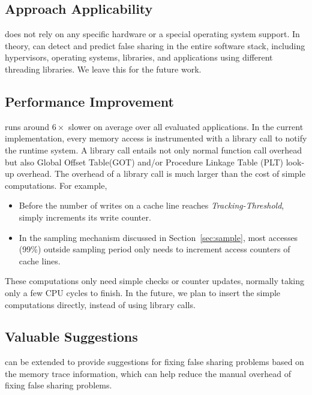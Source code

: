 \label{sec:futurework}

\subsection{Approach Applicability}
\Predator{} does not rely on any specific hardware or a special operating system support.
In theory, \Predator{} can detect and predict false sharing in the entire software stack, including hypervisors, operating systems, libraries, and applications using different threading libraries. We leave this for the future work. 

\subsection{Performance Improvement}
\Predator{} runs around $6\times$ slower on average over all evaluated applications. In the current implementation, every memory access is instrumented with a library call to notify the runtime system. A library call entails not only normal function call overhead but also Global Offset Table(GOT) and/or Procedure Linkage Table (PLT) look-up overhead. 
The overhead of a library call is much larger than the cost of simple computations. For example, 

\begin{itemize}
\item
Before the number of writes on a cache line reaches {\it Tracking-Threshold},  \Predator{} simply increments its write counter.

\item
In the sampling mechanism discussed in Section~\ref{sec:sample}, most accesses (99\%) outside sampling period only needs to increment access counters of cache lines.
\end{itemize}

These computations only need simple checks or counter updates, normally taking only a few CPU cycles to finish. 
In the future, we plan to insert the simple computations directly, instead of using library calls.

\subsection{Valuable Suggestions}
\Predator{} can be extended to provide suggestions for fixing false sharing problems based on the memory trace information, which can help reduce the manual overhead of fixing false sharing problems.  
